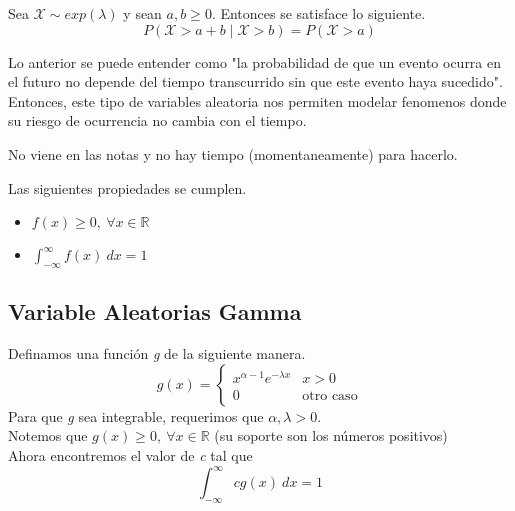 Sea $\mathcal X \sim exp(\lambda)$ y sean $a,b \ge 0$. Entonces se satisface lo siguiente.
\[P(\mathcal X > a + b \mid \mathcal X > b) = P(\mathcal X > a)\]

Lo anterior se puede entender como "la probabilidad de que un evento ocurra en el futuro no depende del tiempo transcurrido sin que este evento haya sucedido". Entonces, este tipo de variables aleatoria nos permiten modelar fenomenos donde su riesgo de ocurrencia no cambia con el tiempo.



\begin{myproof}
  No viene en las notas y no hay tiempo (momentaneamente) para hacerlo.
\end{myproof}

Las siguientes propiedades se cumplen.
\begin{itemize}
  \item $f(x) \ge 0,~ \forall x \in \mathbb R$
  \item $\int_{-\infty}^{\infty} f(x)~dx = 1$
\end{itemize}



\subsection{Variable Aleatorias Gamma}

Definamos una función \textit{g} de la siguiente manera.
\[g(x) = 
  \begin{cases}
    x^{\alpha - 1}e^{-\lambda x} & x > 0\\
    0 & \text{otro caso}
  \end{cases}
\]
Para que \textit{g} sea integrable, requerimos que $\alpha, \lambda > 0$.\\
Notemos que $g(x) \ge 0,~ \forall x \in \mathbb R$ (su soporte son los números positivos)\\
Ahora encontremos el valor de \textit{c} tal que
\[\int_{-\infty}^{\infty}cg(x)~dx = 1\]

